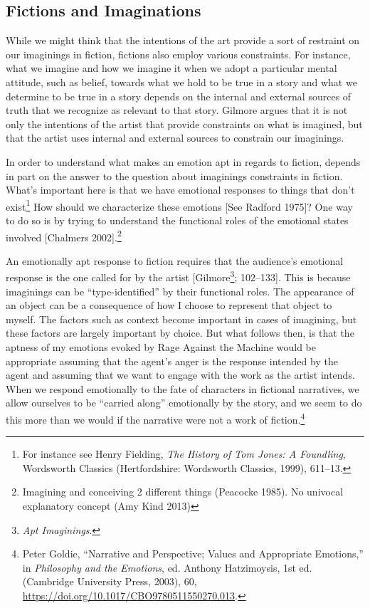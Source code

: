 \documentclass[phdthesis,12pt,final]{wuthesis}
\theoremstyle{definition}
\theoremstyle{definition}
\theoremstyle{definition}
\theoremstyle{definition}
\theoremstyle{remark}
\begin{document}
\subsection*{Fictions and Imaginations}\label{fictions-and-imaginations}

While we might think that the intentions of the art provide a sort of restraint on our imaginings in fiction, fictions also employ various constraints. For instance, what we imagine and how we imagine it when we adopt a particular mental attitude, such as belief, towards what we hold to be true in a story and what we determine to be true in a story depends on the internal and external sources of truth that we recognize as relevant to that story. Gilmore argues that it is not only the intentions of the artist that provide constraints on what is imagined, but that the artist uses internal and external sources to constrain our imaginings.

In order to understand what makes an emotion apt in regards to fiction, depends in part on the answer to the question about imaginings constraints in fiction. What's important here is that we have emotional responses to things that don't exist\footnote{For instance see Henry Fielding, \emph{The {History} of {Tom Jones}: {A} Foundling}, Wordsworth {Classics} (Hertfordshire: Wordsworth Classics, 1999), 611--13.} How should we characterize these emotions {[}See Radford 1975{]}? One way to do so is by trying to understand the functional roles of the emotional states involved {[}Chalmers 2002{]}.\footnote{Imagining and conceiving 2 different things (Peacocke 1985). No univocal explanatory concept (Amy Kind 2013)}

An emotionally apt response to fiction requires that the audience's emotional response is the one called for by the artist {[}Gilmore\footnote{\emph{Apt {Imaginings}}.}; 102--133{]}. This is because imaginings can be ``type-identified'' by their functional roles. The appearance of an object can be a consequence of how I choose to represent that object to myself. The factors such as context become important in cases of imagining, but these factors are largely important by choice. But what follows then, is that the aptness of my emotions evoked by Rage Against the Machine would be appropriate assuming that the agent's anger is the response intended by the agent and assuming that we want to engage with the work as the artist intends. When we respond emotionally to the fate of characters in fictional narratives, we allow ourselves to be ``carried along'' emotionally by the story, and we seem to do this more than we would if the narrative were not a work of fiction.\footnote{Peter Goldie, {``Narrative and {Perspective}; {Values} and {Appropriate Emotions},''} in \emph{Philosophy and the {Emotions}}, ed. Anthony Hatzimoysis, 1st ed. (Cambridge University Press, 2003), 60, \url{https://doi.org/10.1017/CBO9780511550270.013}.}
\end{document}
